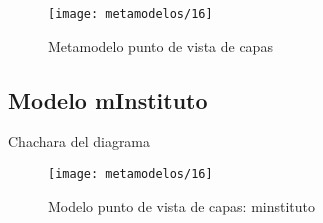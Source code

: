    \begin{figure}[H]
   	\centering
   	\texttt{[image: metamodelos/16]}
   	\captionsetup{width=.95\textwidth}
   	\caption{Metamodelo punto de vista de capas}
   	\label{metamodelo16}
   \end{figure}
   
   \subsection{Modelo mInstituto}Chachara del diagrama
   \begin{figure}[H]
   	\centering
   	\texttt{[image: metamodelos/16]}
   	\captionsetup{width=.95\textwidth}
   	\caption{Modelo punto de vista de capas: minstituto}
   	\label{modelo16}
   \end{figure}